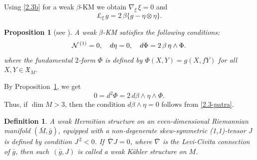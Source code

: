 \documentclass[11pt,a4paper,twoside]{article}
\newtheorem{definition}{Definition}%
\newtheorem{proposition}{Proposition}%
\begin{document}
{Using \eqref{2.3b} for a weak $\beta$-KM we obtain $\nabla_\xi\,\xi=0$ and
\begin{equation}\label{2.3d}
 \pounds_\xi\,g = 2\,\beta\{g - \eta\otimes\eta\} .
\end{equation}


\begin{proposition}[see \cite{rov-126}]
\label{P-2.1}
A weak $\beta$-KM satisfies the following conditions:
\begin{align*}%
 {\cal N}^{\,(1)} = 0,\quad
 d\eta = 0,\quad
 d\Phi = 2\,\beta\,\eta\wedge\Phi .
\end{align*}
where the {fundamental $2$-form} $\Phi$ is defined by
 $\Phi(X,Y)=g(X,{f} Y)$ for all $X,Y\in\mathfrak{X}_M$.
\end{proposition}

By Proposition~\ref{P-2.1}, we get
\[
 0= d^2\Phi=2\,d\beta\wedge\eta\wedge\Phi.
\]
Thus, if $\dim M>3$, then the condition $d\beta\wedge\eta=0$ follows from \eqref{2.3-patra}.



\begin{definition}\label{D-wK2}\rm
A \textit{weak Hermitian structure} on an even-dimensional Riemannian manifold
$(\bar M, \bar g)$, equipped with a non-degenerate skew-symmetric {\rm (1,1)}-tensor $J$ is defined by condition $J^{\,2}<0$.
If~$\bar\nabla J=0$, where $\bar\nabla$ is the Levi-Civita connection of $\bar g$, then such~$(\bar g, J)$ is called a \textit{weak K\"{a}hler structure} on $M$.
\end{definition}

}
\end{document}
